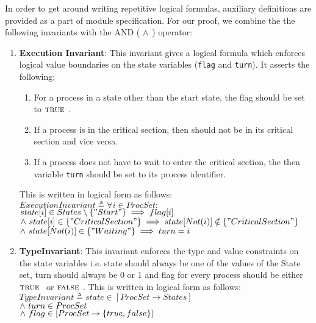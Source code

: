 \documentclass[fleqn]{tukseminar}
\begin{document}
			In order to get around writing repetitive logical formulas, auxiliary definitions are provided as a part of module specification. For our proof, we combine the the following invariants with the AND ( $\land \ $) operator:
			\begin{enumerate}
				\item \textbf{Execution Invariant}: This invariant gives a logical formula which enforces logical value boundaries on the state variables (\lstinline|flag| and \lstinline|turn|). It asserts the following:
				\begin{enumerate}
					\item For a process in a state other than the start state, the flag should be set to $\mbox{\textsc{true }}$.
					\item If a process \pa is in the critical section, then \pb should not be in its critical section and vice versa.
					\item  If a process does not have to wait to enter the critical section, the then variable \lstinline|turn| should be set to its process identifier.
					\end{enumerate}
				
				This is written in logical form as follows:\\
				
				$ ExecutionInvariant \triangleq \forall i \in ProcSet:$ \\
				\hspace*{2.4cm}$state[i] \in States \setminus  \{"Start"\} \implies flag[i] $\\
				\hspace*{2cm}$\land \   state[i] \in \{"CriticalSection"\} \implies state[Not(i)] \notin \{"CriticalSection"\}$\\
				\hspace*{2cm}$\land \  state[Not(i)] \in \{"Waiting"\} \implies turn = i$\\
				
				\item \textbf{TypeInvariant}: This invariant enforces the type and value constraints on the state variables i.e. state should always be one of the values of the State set, turn should always be 0 or 1 and flag for every process should be either $\mbox{\textsc{true }}$ or $\mbox{\textsc{false }}$. This is written in logical form as follows:\\
				
				$ TypeInvariant \triangleq state \in [ProcSet \rightarrow States]$ \\
				\hspace*{2cm}$\land \  turn \in ProcSet$\\
				\hspace*{2cm}$\land \  flag \in [ProcSet \rightarrow \{true, false\}]$\\
				
			\end{enumerate} 
			
\end{document}

